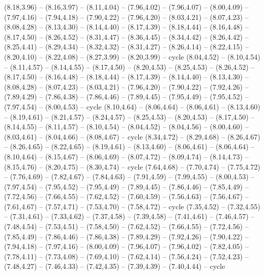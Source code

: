 \expandafter\def\csname geo:gebiet:PAK\endcsname{
  (8.18,3.96) -- (8.16,3.97) -- (8.11,4.04) -- (7.96,4.02) -- (7.96,4.07) -- (8.00,4.09) -- (7.97,4.16) -- (7.94,4.18) -- (7.90,4.22) -- (7.96,4.20) -- (8.03,4.21) -- (8.07,4.23) -- (8.08,4.28) -- (8.13,4.30) -- (8.14,4.40) -- (8.17,4.39) -- (8.18,4.44) -- (8.16,4.48) -- (8.17,4.50) -- (8.26,4.52) -- (8.31,4.47) -- (8.36,4.45) -- (8.34,4.42) -- (8.26,4.42) -- (8.25,4.41) -- (8.29,4.34) -- (8.32,4.32) -- (8.31,4.27) -- (8.26,4.14) -- (8.22,4.15) -- (8.20,4.10) -- (8.22,4.08) -- (8.27,3.99) -- (8.20,3.99) -- cycle}
\expandafter\def\csname geo:gebiet:AFG\endcsname{
  (8.04,4.52) -- (8.10,4.54) -- (8.11,4.57) -- (8.14,4.55) -- (8.17,4.50) -- (8.20,4.53) -- (8.25,4.53) -- (8.26,4.52) -- (8.17,4.50) -- (8.16,4.48) -- (8.18,4.44) -- (8.17,4.39) -- (8.14,4.40) -- (8.13,4.30) -- (8.08,4.28) -- (8.07,4.23) -- (8.03,4.21) -- (7.96,4.20) -- (7.90,4.22) -- (7.92,4.26) -- (7.89,4.29) -- (7.86,4.38) -- (7.86,4.46) -- (7.89,4.45) -- (7.95,4.49) -- (7.95,4.52) -- (7.97,4.54) -- (8.00,4.53) -- cycle}
\expandafter\def\csname geo:gebiet:TJK\endcsname{
  (8.10,4.64) -- (8.06,4.64) -- (8.06,4.61) -- (8.13,4.60) -- (8.19,4.61) -- (8.21,4.57) -- (8.24,4.57) -- (8.25,4.53) -- (8.20,4.53) -- (8.17,4.50) -- (8.14,4.55) -- (8.11,4.57) -- (8.10,4.54) -- (8.04,4.52) -- (8.04,4.56) -- (8.00,4.60) -- (8.03,4.61) -- (8.04,4.66) -- (8.08,4.67) -- cycle}
\expandafter\def\csname geo:gebiet:KGZ\endcsname{
  (8.34,4.72) -- (8.29,4.68) -- (8.26,4.67) -- (8.26,4.65) -- (8.22,4.65) -- (8.19,4.61) -- (8.13,4.60) -- (8.06,4.61) -- (8.06,4.64) -- (8.10,4.64) -- (8.15,4.67) -- (8.06,4.69) -- (8.07,4.72) -- (8.09,4.74) -- (8.14,4.73) -- (8.15,4.76) -- (8.20,4.75) -- (8.30,4.74) -- cycle}
\expandafter\def\csname geo:gebiet:TKM\endcsname{
  (7.64,4.68) -- (7.70,4.74) -- (7.75,4.72) -- (7.76,4.69) -- (7.82,4.67) -- (7.84,4.63) -- (7.91,4.59) -- (7.99,4.55) -- (8.00,4.53) -- (7.97,4.54) -- (7.95,4.52) -- (7.95,4.49) -- (7.89,4.45) -- (7.86,4.46) -- (7.85,4.49) -- (7.72,4.56) -- (7.66,4.55) -- (7.62,4.52) -- (7.60,4.59) -- (7.56,4.63) -- (7.56,4.67) -- (7.61,4.67) -- (7.57,4.71) -- (7.53,4.70) -- (7.58,4.72) -- cycle}
\expandafter\def\csname geo:gebiet:IRN\endcsname{
  (7.35,4.52) -- (7.32,4.55) -- (7.31,4.61) -- (7.33,4.62) -- (7.37,4.58) -- (7.39,4.58) -- (7.41,4.61) -- (7.46,4.57) -- (7.48,4.54) -- (7.53,4.51) -- (7.58,4.50) -- (7.62,4.52) -- (7.66,4.55) -- (7.72,4.56) -- (7.85,4.49) -- (7.86,4.46) -- (7.86,4.38) -- (7.89,4.29) -- (7.92,4.26) -- (7.90,4.22) -- (7.94,4.18) -- (7.97,4.16) -- (8.00,4.09) -- (7.96,4.07) -- (7.96,4.02) -- (7.82,4.05) -- (7.78,4.11) -- (7.73,4.08) -- (7.69,4.10) -- (7.62,4.14) -- (7.56,4.24) -- (7.52,4.23) -- (7.48,4.27) -- (7.46,4.33) -- (7.42,4.35) -- (7.39,4.39) -- (7.40,4.44) -- cycle}
